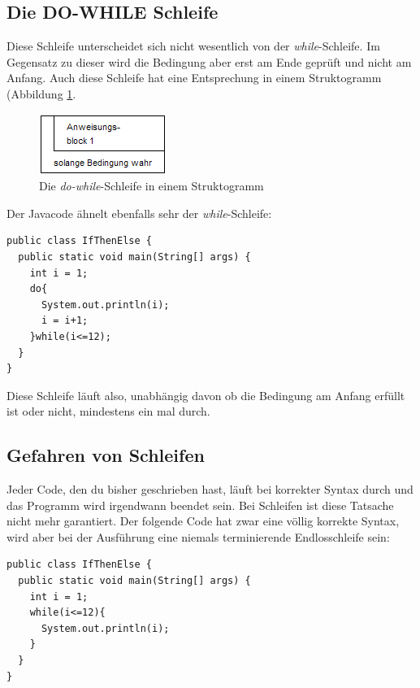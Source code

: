 \subsection{Die DO-WHILE Schleife}

Diese Schleife unterscheidet sich nicht wesentlich von der \textit{while}-Schleife. Im Gegensatz zu dieser wird die Bedingung aber erst am Ende geprüft und nicht am Anfang. Auch diese Schleife hat eine Entsprechung in einem Struktogramm (Abbildung \ref{dowhile}.

\begin{figure}
	\begin{center}\includegraphics{images/dowhile.png}\end{center}
	\caption{Die \textit{do-while}-Schleife in einem Struktogramm}
	\label{dowhile}
\end{figure}

Der Javacode ähnelt ebenfalls sehr der \textit{while}-Schleife:

\begin{minipage}{\textwidth}
\begin{lstlisting}
public class IfThenElse {
  public static void main(String[] args) {
    int i = 1;
    do{
      System.out.println(i);
      i = i+1;
    }while(i<=12);
  }
}
\end{lstlisting}
\end{minipage}

Diese Schleife läuft also, unabhängig davon ob die Bedingung am Anfang erfüllt ist oder nicht, mindestens ein mal durch.

\subsection{Gefahren von Schleifen}

Jeder Code, den du bisher geschrieben hast, läuft bei korrekter Syntax durch und das Programm wird irgendwann beendet sein. Bei Schleifen ist diese Tatsache nicht mehr garantiert. Der folgende Code hat zwar eine völlig korrekte Syntax, wird aber bei der Ausführung eine niemals terminierende Endlosschleife sein:

\begin{minipage}{\textwidth}
\begin{lstlisting}
public class IfThenElse {
  public static void main(String[] args) {
    int i = 1;
    while(i<=12){
      System.out.println(i);
    }
  }
}
\end{lstlisting}
\end{minipage}

